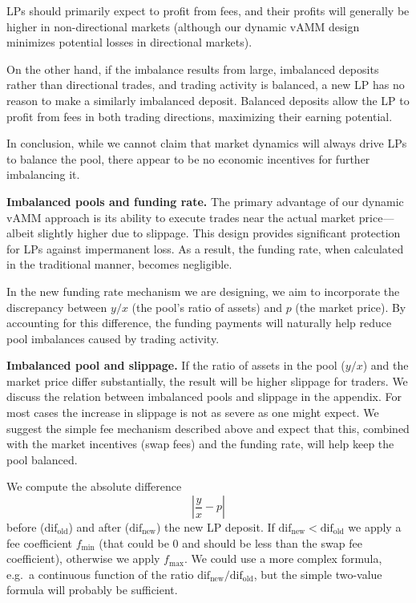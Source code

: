 \documentclass{article}
\begin{document}
LPs should primarily expect to profit from fees, and their profits will generally be higher
in non-directional markets (although our dynamic vAMM design minimizes potential losses in
directional markets).

On the other hand, if the imbalance results from large, imbalanced deposits rather than
directional trades, and trading activity is balanced, a new LP has no reason to make a
similarly imbalanced deposit. Balanced deposits allow the LP to profit from fees in both
trading directions, maximizing their earning potential.

In conclusion, while we cannot claim that market dynamics will always drive LPs to balance
the pool, there appear to be no economic incentives for further imbalancing it.

\medskip
\noindent\textbf{Imbalanced pools and funding rate.} The primary advantage of our dynamic
vAMM approach is its ability to execute trades near the actual market price---albeit
slightly higher due to slippage. This design provides significant protection for LPs
against impermanent loss. As a result, the funding rate, when calculated in the traditional
manner, becomes negligible.

In the new funding rate mechanism we are designing, we aim to incorporate the discrepancy
between $y/x$ (the pool's ratio of assets) and $p$ (the market price). By accounting for
this difference, the funding payments will naturally help reduce pool imbalances caused by
trading activity.

\medskip
\noindent\textbf{Imbalanced pool and slippage.} If the ratio of assets in the pool ($y/x$)
and the market price differ substantially, the result will be higher slippage for traders.
We discuss the relation between imbalanced pools and slippage in the appendix. For most
cases the increase in slippage is not as severe as one might expect. We suggest the simple
fee mechanism described above and expect that this, combined with the market incentives
(swap fees) and the funding rate, will help keep the pool balanced.

We compute the absolute difference
\begin{equation}
\left|\frac{y}{x} - p\right|
\end{equation}
before ($\mathrm{dif}_{\mathrm{old}}$) and after ($\mathrm{dif}_{\mathrm{new}}$) the new LP
deposit. If $\mathrm{dif}_{\mathrm{new}} < \mathrm{dif}_{\mathrm{old}}$ we apply a fee
coefficient $f_{\min}$ (that could be $0$ and should be less than the swap fee
coefficient), otherwise we apply $f_{\max}$. We could use a more complex formula, e.g.\ a
continuous function of the ratio $\mathrm{dif}_{\mathrm{new}}/\mathrm{dif}_{\mathrm{old}}$,
but the simple two-value formula will probably be sufficient.
\end{document}
